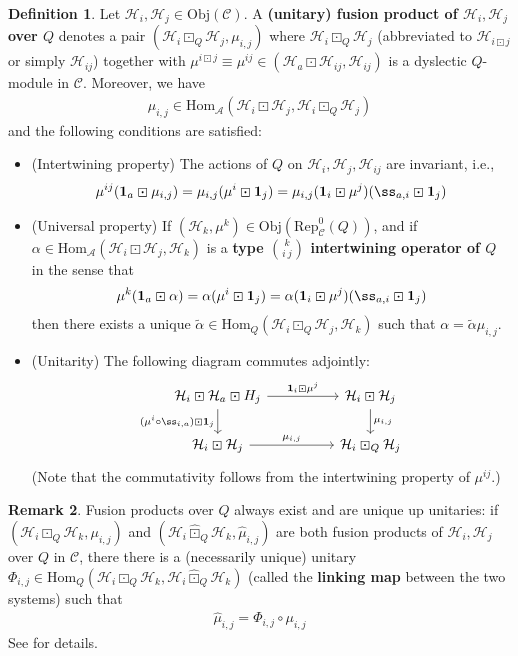 \documentclass[11pt,b5paper,notitlepage]{article}
\theoremstyle{definition}
\newtheorem{df}{Definition}[section]
\newtheorem{rem}[df]{Remark}
\theoremstyle{plain}
\newcommand{\mc}{\mathcal}
\newcommand{\wtd}{\widetilde}
\newcommand{\wht}{\widehat}
\newcommand{\idt}{\mathbf{1}}
\newcommand{\Hom}{\mathrm{Hom}}
\newcommand{\Rep}{\mathrm{Rep}}
\newcommand{\scr}{\mathscr}
\newcommand{\Obj}{\mathrm{Obj}}
\numberwithin{equation}{section}
\begin{document}
\begin{df}
Let $\mc H_i,\mc H_j\in\Obj(\scr C)$. A \textbf{(unitary) fusion product of $\mc H_i,\mc H_j$ over $Q$} denotes a pair $(\mc H_i\boxdot_Q\mc H_j,\mu_{i,j})$ where $\mc H_i\boxdot_Q\mc H_j$ (abbreviated to $\mc H_{i\boxdot j}$ or simply $\mc H_{ij}$) together with $\mu^{i\boxdot j}\equiv\mu^{ij}\in(\mc H_a\boxdot\mc H_{ij},\mc H_{ij})$ is a dyslectic $Q$-module in $\scr C$. Moreover, we have
\begin{align}
\mu_{i,j}\in\Hom_{\mc A}(\mc H_i\boxdot\mc H_j,\mc H_i\boxdot_Q\mc H_j)
\end{align}
and the following conditions are satisfied:
\begin{itemize}
\item (Intertwining property) The actions of $Q$ on $\mc H_i,\mc H_j,\mc H_{ij}$ are invariant, i.e.,
\begin{align*}
\mu^{ij}(\idt_a\boxdot \mu_{i,j})=\mu_{i,j}(\mu^i\boxdot\idt_j)=\mu_{i,j}(\idt_i\boxdot\mu^j)(\ss_{a,i}\boxdot\idt_j)
\end{align*}
\item (Universal property) If $(\mc H_k,\mu^k)\in\Obj(\Rep_{\scr C}^0(Q))$, and if $\alpha\in\Hom_{\mc A}(\mc H_i\boxdot\mc H_j,\mc H_k)$ is a \textbf{type $k\choose i~j$ intertwining operator of $Q$} in the sense that
\begin{align*}
\mu^k(\idt_a\boxdot \alpha)=\alpha(\mu^i\boxdot\idt_j)=\alpha(\idt_i\boxdot\mu^j)(\ss_{a,i}\boxdot\idt_j)
\end{align*}
then there exists a unique $\wtd\alpha\in\Hom_Q(\mc H_i\boxdot_Q\mc H_j,\mc H_k)$ such that $\alpha=\wtd\alpha\mu_{i,j}$.
\item (Unitarity) The following diagram commutes adjointly:
\begin{equation}
\begin{tikzcd}
\mc H_i\boxdot\mc H_a\boxdot H_j\arrow[rr,"\idt_i\boxdot\mu^j"]\arrow[d,"(\mu^i\circ\ss_{i,a})\boxdot\idt_j"'] && \mc H_i\boxdot\mc H_j\arrow[d,"\mu_{i,j}"]\\
\mc H_i\boxdot\mc H_j\arrow[rr,"\mu_{i,j}"] && \mc H_i\boxdot_Q\mc H_j
\end{tikzcd}	
\end{equation} 
(Note that the commutativity follows from the intertwining property of $\mu^{ij}$.)
\end{itemize}
\end{df}

\begin{rem}\label{lb17}
Fusion products over $Q$ always exist and are unique up unitaries: if $(\mc H_i\boxdot_Q\mc H_k,\mu_{i,j})$ and $(\mc H_i\wht\boxdot_Q\mc H_k,\wht\mu_{i,j})$ are both fusion products of $\mc H_i,\mc H_j$ over $Q$ in $\scr C$, there there is a (necessarily unique) unitary $\Phi_{i,j}\in\Hom_Q(\mc H_i\boxdot_Q\mc H_k,\mc H_i\wht\boxdot_Q\mc H_k)$ (called the \textbf{linking map} between the two systems) such that
\begin{align}\label{eq64}
\wht\mu_{i,j}=\Phi_{i,j}\circ\mu_{i,j}
\end{align}
See \cite[Sec. 3.1]{Gui22} for details.
\end{rem}
\end{document}
